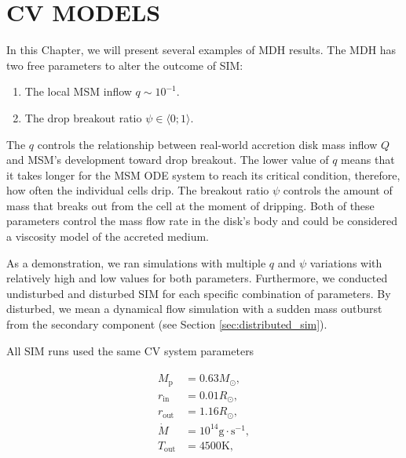\chapter{CV MODELS}
\label{chap:cv_models}
\thispagestyle{empty}

    In this Chapter, we will present several examples of MDH results. The MDH has two free parameters to alter the outcome of SIM: 

    \begin{enumerate}
        \item The local MSM inflow $q \sim 10^{-1}$.
        \item The drop breakout ratio $\psi \in \langle 0; 1 \rangle$.
    \end{enumerate}

    The $q$ controls the relationship between real-world accretion disk mass inflow $Q$ and MSM's development toward drop breakout. The lower value of $q$ means that it takes longer for the MSM ODE system to reach its critical condition, therefore, how often the individual cells drip. The breakout ratio $\psi$ controls the amount of mass that breaks out from the cell at the moment of dripping. Both of these parameters control the mass flow rate in the disk's body and could be considered a viscosity model of the accreted medium. 

    As a demonstration, we ran simulations with multiple $q$ and $\psi$ variations with relatively high and low values for both parameters. Furthermore, we conducted undisturbed and disturbed SIM for each specific combination of parameters. By disturbed, we mean a dynamical flow simulation with a sudden mass outburst from the secondary component (see Section \ref{sec:distributed_sim}).

    All SIM runs used the same CV system parameters

    \begin{align}
    \begin{split}
        M_{\mathrm{p}} &= 0.63 M_{\odot}, \\
        r_{\mathrm{in}} &= 0.01 R_{\odot}, \\
        r_{\mathrm{out}} &= 1.16 R_{\odot}, \\
        \dot{M} &= 10^{14} \si{\gram \cdot \second^{-1}}, \\
        T_{\mathrm{out}} &= 4500 \si{\kelvin},
    \end{split}
    \end{align}

